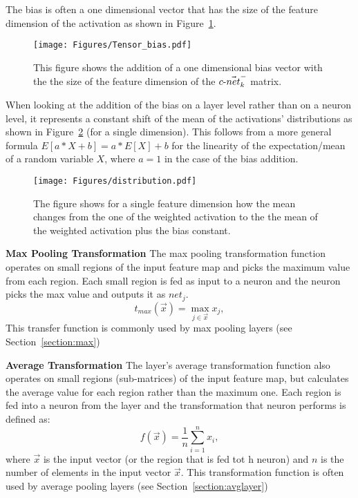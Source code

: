 The bias is often a one dimensional vector that has the size of the feature dimension of the activation as shown in Figure~\ref{fig:dimentionality_bias}. 
\begin{figure}[ht!]
	\begin{center}
		\texttt{[image: Figures/Tensor\_bias.pdf]}
	\end{center}
	\caption{This figure shows the addition of a one dimensional bias vector with the the size of the feature dimension of the $\text{$c$-}\vec{net}_{k}^-$ matrix.}
	\label{fig:dimentionality_bias}
\end{figure} 

When looking at the addition of the bias on a layer level rather than on a neuron level, it represents a constant shift of the mean of the activations' distributions as shown in Figure~\ref{fig:addingbias} (for a single dimension). This follows from a more general formula $E[a*X+b] = a*E[X] + b$ for the linearity of the expectation/mean of a random variable $X$, where $a =1$ in the case of the bias addition. 
\begin{figure}[ht!]
	\begin{center}
		\texttt{[image: Figures/distribution.pdf]}
	\end{center}
	\caption{The figure shows for a single feature dimension how the mean changes from the one of the weighted activation to the the mean of the weighted activation plus the bias constant.}
	\label{fig:addingbias}
\end{figure} 

\textbf{Max Pooling Transformation}
The max pooling transformation function operates on small regions of the input feature map and picks the maximum value from each region. Each small region is fed as input to a neuron and the neuron picks the max value and outputs it as $net_j$.
\label{section:maxout}
\begin{equation}
t_{max}(\vec{x}) =\max _{j \in \vec{x}} x_j, 
\label{eq:max}
\end{equation}
This transfer function is commonly used by max pooling layers (see Section~\ref{section:max})

\textbf{Average Transformation}
\label{section:avg}
The layer's average transformation function also operates on small regions (sub-matrices) of the input feature map, but calculates the average value for each region rather than the maximum one. Each region is fed into a neuron from the layer and the transformation that neuron performs is defined as:
\begin{equation}
f(\Vec{x})=\frac{1}{n} \sum_{i=1}^n x_i,
\label{eq:avg}
\end{equation}
where $\vec{x}$ is the input vector (or the region that is fed tot h neuron) and $n$ is the number of elements in the input vector $\vec{x}$. This transformation function is often used by average pooling layers (see Section~\ref{section:avglayer})

